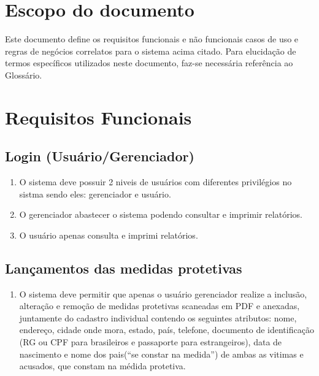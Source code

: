 \documentclass[
	12pt,				%
    oneside,			%
	a4paper,			%
	english,			%
	french,				%
	spanish,			%
	brazil,				%
	]{abntex2}
\begin{document}
	\section{Escopo do documento}
	
		Este documento define os requisitos funcionais e não funcionais casos de uso e regras de negócios correlatos para o sistema acima citado. Para elucidação de termos específicos utilizados neste documento, faz-se necessária referência ao Glossário.

	\section {Requisitos Funcionais}\label{RF}
	
		\subsection{Login (Usuário/Gerenciador)}\label{RF1}
			\begin{enumerate}
				\item O sistema deve possuir 2 niveis de usuários com diferentes privilégios no sistma sendo eles: gerenciador e usuário.\label{login1}
				 \item O gerenciador abastecer o sistema podendo consultar e imprimir relatórios.
				 \item O usuário apenas consulta e imprimi relatórios.
			
			\end{enumerate}
		 
		\subsection{Lançamentos das medidas protetivas}\label{RF2} 
	    	\begin{enumerate} 
				\item O sistema deve permitir que apenas o usuário gerenciador realize a inclusão, alteração e remoção de medidas protetivas scaneadas em PDF e anexadas, juntamente do cadastro individual contendo os seguintes atributos: nome, endereço, cidade onde mora, estado, país, telefone, documento de identificação (RG ou CPF para brasileiros e passaporte para estrangeiros), data de nascimento e nome dos pais(“se constar na medida”) de ambas as vitimas e acusados, que constam na médida protetiva.\label{teste}
			
		   	\end{enumerate}
   	
\end{document}
